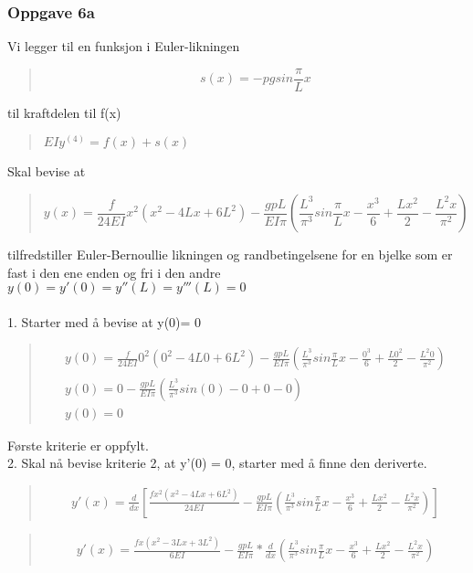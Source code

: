 \subsubsection{Oppgave 6a}
Vi legger til en funksjon i Euler-likningen
\begin{quote}
\begin{equation} \label{eq:sin(x)}
s(x) = -pgsin\frac{\pi}{L} x
\end{equation}
\end{quote} 
til kraftdelen til f(x)
\begin{quote}
$EIy^{(4)} = f(x) + s(x)$
\end{quote}
Skal bevise at
\begin{quote}
\begin{equation}\label{eq:oppgave6a}
y(x) = \frac{f}{24EI} x^2 (x^2 - 4Lx + 6L^2) - \frac{gpL}{EI\pi} (\frac{L^3}{\pi^3} sin\frac{\pi}{L}x - \frac{x^3}{6} + \frac{Lx^2}{2} - \frac{L^2 x}{\pi^2})
\end{equation}
\end{quote}
tilfredstiller Euler-Bernoullie likningen og randbetingelsene for en bjelke som er fast i den ene enden og fri i den andre\\
$y(0) = y'(0) = y''(L) = y'''(L) = 0$ \\
\\
1. Starter med å bevise at y(0)= 0
\begin{quote}
\begin{multline*}
y(0) = \frac{f}{24EI} 0^2 (0^2 - 4L0 + 6L^2) - \frac{gpL}{EI\pi} (\frac{L^3}{\pi^3} sin\frac{\pi}{L}x - \frac{0^3}{6} + \frac{L0^2}{2} - \frac{L^2 0}{\pi^2}) \\
y(0) = 0 - \frac{gpL}{EI\pi} (\frac{L^3}{\pi^3} sin (0) - 0 + 0 - 0 ) \\
y(0) = 0
\end{multline*}
\end{quote}
Første kriterie er oppfylt.
\\
2. Skal nå bevise kriterie 2, at y'(0) = 0, starter med å finne den deriverte.
\begin{quote}
\begin{multline}
y'(x) = \frac{d}{dx} [\frac{fx^2(x^2-4Lx+6L^2)}{24EI} - \frac{gpL}{EI\pi} (\frac{L^3}{\pi^3} sin \frac{\pi}{L}x - \frac{x^3}{6} + \frac{Lx^2}{2} - \frac{L^2x}{\pi^2})]
\end{multline}
\end{quote}

\begin{quote}
\begin{multline*}
y'(x) = \frac{fx(x^2-3Lx+3L^2)}{6EI} - \frac{gpL}{EI\pi}*\frac{d}{dx} (\frac{L^3}{\pi^3} sin \frac{\pi}{L}x - \frac{x^3}{6} + \frac{Lx^2}{2} - \frac{L^2x}{\pi^2})
\end{multline*}
\end{quote}

